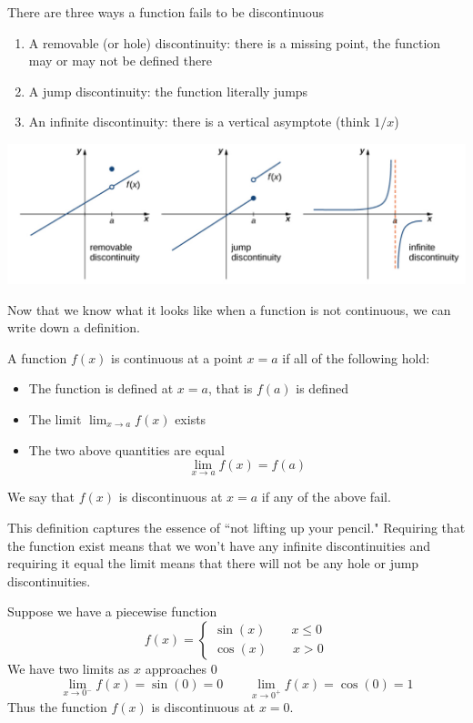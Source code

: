 There are three ways a function fails to be discontinuous
\begin{enumerate}
	\item A removable (or hole) discontinuity: there is a missing point, the function may or may not be defined there
	\item A jump discontinuity: the function literally jumps
	\item An infinite discontinuity: there is a vertical asymptote (think $1/x$)
\end{enumerate}

\begin{center}
	\includegraphics[scale=0.55]{images/Figure 2.3.1.png} 
\end{center}

Now that we know what it looks like when a function is not continuous, we can write down a definition. 
\begin{definition}
	A function $f(x)$ is continuous at a point $x = a$ if all of the following hold:
	\begin{itemize}
		\item The function is defined at $x = a$, that is $f(a)$ is defined
		\item The limit $\lim_{x \to a} f(x)$ exists
		\item The two above quantities are equal
		\[ \lim_{x \to a} f(x) = f(a) \]
	\end{itemize}
	We say that $f(x)$ is discontinuous at $x = a$ if any of the above fail.
\end{definition}

This definition captures the essence of ``not lifting up your pencil." Requiring that the function exist means that we won't have any infinite discontinuities and requiring it equal the limit means that there will not be any hole or jump discontinuities.

\begin{example}
	Suppose we have a piecewise function
	\[ f(x) = \begin{cases}
	\sin(x) \qquad x \leq 0 \\
	\cos(x) \qquad x > 0
	\end{cases} \]
	We have two limits as $x$ approaches 0
	\[ \lim_{x \to 0^-} f(x) = \sin(0) = 0 \qquad \lim_{x \to 0^+} f(x) = \cos(0) = 1 \]
	Thus the function $f(x)$ is discontinuous at $x = 0$.
\end{example}

